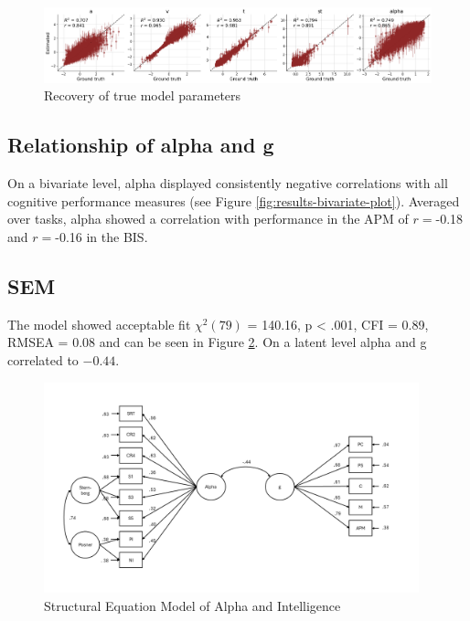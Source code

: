 \documentclass[
  man,floatsintext]{apa7}
\begin{document}
\begin{figure}
\includegraphics[width=6.63in]{images/recovery_plot} \caption{Recovery of true model parameters}\label{fig:results-bf-recovery}
\end{figure}

\hypertarget{relationship-of-alpha-and-g}{%
\subsection{Relationship of alpha and g}\label{relationship-of-alpha-and-g}}

On a bivariate level, alpha displayed consistently negative correlations with all cognitive performance measures (see Figure \ref{fig:results-bivariate-plot}). Averaged over tasks, alpha showed a correlation with performance in the APM of \(r =\)-0.18 and \(r =\)-0.16 in the BIS.




\hypertarget{sem}{%
\subsection{SEM}\label{sem}}

The model showed acceptable fit \(\chi^2(79)\) = 140.16, p \textless{} .001, CFI = 0.89, RMSEA = 0.08 and can be seen in Figure \ref{fig:results-sem-alpha}. On a latent level alpha and g correlated to \(-0.44\).



\begin{figure}
\includegraphics[width=4.27in]{images/sem_alpha_plot} \caption{Structural Equation Model of Alpha and Intelligence}\label{fig:results-sem-alpha}
\end{figure}
\end{document}
